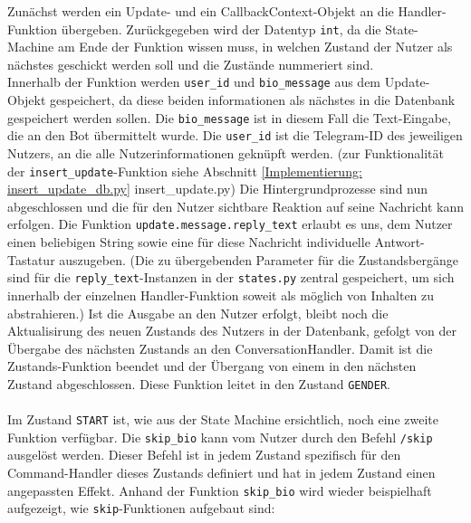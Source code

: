             Zunächst werden ein Update- und ein CallbackContext-Objekt an die Handler-Funktion übergeben. Zurückgegeben wird der Datentyp \verb|int|, da die State-Machine am Ende der Funktion wissen muss, in welchen Zustand der Nutzer als nächstes geschickt werden soll und die Zustände nummeriert sind. \\
            Innerhalb der Funktion werden \verb|user_id| und \verb|bio_message| aus dem Update-Objekt gespeichert, da diese beiden informationen als nächstes in die Datenbank gespeichert werden sollen. Die \verb|bio_message| ist in diesem Fall die Text-Eingabe, die an den Bot übermittelt wurde. Die \verb|user_id| ist die Telegram-ID des jeweiligen Nutzers, an die alle Nutzerinformationen geknüpft werden.
            (zur Funktionalität der \verb|insert_update|-Funktion siehe Abschnitt \ref{Implementierung: insert_update_db.py} insert\_update.py)
            Die Hintergrundprozesse sind nun abgeschlossen und die für den Nutzer sichtbare Reaktion auf seine Nachricht kann erfolgen. Die Funktion \verb|update.message.reply_text| erlaubt es uns, dem Nutzer einen beliebigen String sowie eine für diese Nachricht individuelle Antwort-Tastatur auszugeben. (Die zu übergebenden Parameter für die Zustandsbergänge sind für die \verb|reply_text|-Instanzen in der \verb|states.py| zentral gespeichert, um sich innerhalb der einzelnen Handler-Funktion soweit als möglich von Inhalten zu abstrahieren.)
            Ist die Ausgabe an den Nutzer erfolgt, bleibt noch die Aktualisirung des neuen Zustands des Nutzers in der Datenbank, gefolgt von der Übergabe des nächsten Zustands an den ConversationHandler. Damit ist die Zustands-Funktion beendet und der Übergang von einem in den nächsten Zustand abgeschlossen. Diese Funktion leitet in den Zustand \verb|GENDER|.\\ \\

                Im Zustand \verb|START| ist, wie aus der State Machine ersichtlich, noch eine zweite Funktion verfügbar. Die \verb|skip_bio| kann vom Nutzer durch den Befehl \verb|/skip| ausgelöst werden. Dieser Befehl ist in jedem Zustand spezifisch für den Command-Handler dieses Zustands definiert und hat in jedem Zustand einen angepassten Effekt. Anhand der Funktion \verb|skip_bio| wird wieder beispielhaft aufgezeigt, wie \verb|skip|-Funktionen aufgebaut sind:


